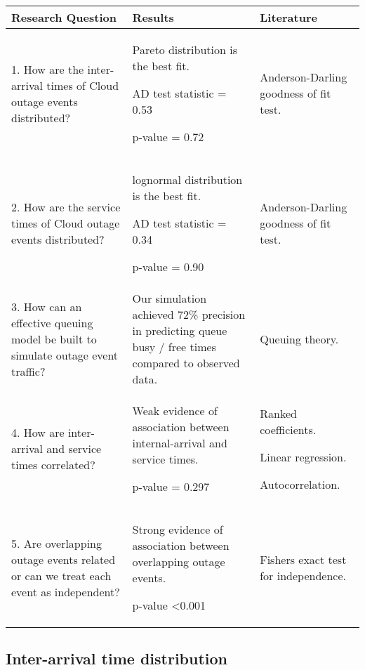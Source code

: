 \documentclass[5p]{elsarticle}
\begin{document}
\begin {table*}[]
\caption {Summary of research question, results and background literature} 
\begin{flushleft}
\begin{tabular}{| p{6.5cm} | p{5.5cm} | p{5cm} |} \hline \bf{Research Question}  & \bf{Results} & \bf{Literature} 
\\ \hline 1. How are the inter-arrival times of Cloud outage events distributed? & Pareto distribution is the best fit. \par AD test statistic = 0.53 \par p-value = 0.72  & Anderson-Darling goodness of fit test. \cite {anderson1952asymptotic}
\\ \hline 2. How are the service times of Cloud outage events distributed? & lognormal distribution is the best fit. \par AD test statistic = 0.34 \par p-value = 0.90 & Anderson-Darling goodness of fit test. \cite {anderson1952asymptotic}
\\ \hline 3. How can an effective queuing model be built to simulate outage event traffic? & Our simulation achieved 72\% precision in predicting queue busy / free times compared to observed data. &  Queuing theory. \cite{kleinrock1975queuing}\cite{gross2008fundamentals}
\\ \hline 4. How are inter-arrival and service times correlated? & Weak evidence of association between internal-arrival and service times. \par p-value = 0.297 & Ranked coefficients. \cite{fisher1915frequency}\cite{spearman1904proof} \par Linear regression. \cite{galton1890kinship} \par Autocorrelation. \cite{box1970distribution}
\\ \hline 5. Are overlapping outage events related or can we treat each event as independent? & Strong evidence of association between overlapping outage events. \par p-value \textless 0.001 & Fishers exact test for independence. \cite{fisher1922interpretation}\cite{fisher1925statistical}
\\ \hline 
 \end{tabular}
\end{flushleft}
\end{table*}


\subsection{Inter-arrival time distribution}
\end{document}
